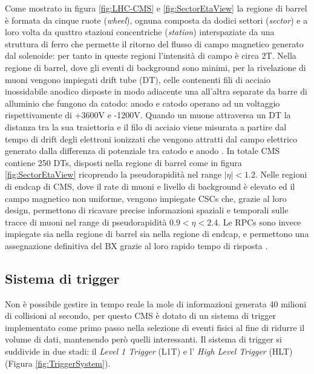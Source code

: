 Come mostrato in figura \ref{fig:LHC-CMS} e \ref{fig:SectorEtaView} la regione di barrel è formata da cinque ruote (\textit{wheel}), ognuna composta da dodici settori (\textit{sector}) e a loro volta da quattro stazioni concentriche (\textit{station}) interspaziate da una struttura di ferro che permette il ritorno del flusso di campo magnetico generato dal solenoide: per tanto in queste regioni l'intensità di campo è circa 2T. Nella regione di barrel, dove gli eventi di background sono minimi, per la rivelazione di muoni vengono impiegati drift tube (DT), celle contenenti fili di acciaio inossidabile anodico disposte in modo adiacente una all'altra separate da barre di alluminio che fungono da catodo: anodo e catodo operano ad un voltaggio rispettivamente di +3600V e -1200V. Quando un muone attraversa un DT la distanza tra la sua traiettoria e il filo di acciaio viene misurata a partire dal tempo di drift degli elettroni ionizzati che vengono attratti dal campo elettrico generato dalla differenza di potenziale tra catodo e anodo \cite{MasterThesisNicLai}. \newline
In totale CMS contiene 250 DTs, disposti nella regione di barrel come in figura \ref{fig:SectorEtaView} ricoprendo la pseudorapidità nel range $|\eta| < 1.2$. \newline
Nelle regioni di endcap di CMS, dove il rate di muoni e livello di background è elevato ed il campo magnetico non uniforme, vengono impiegate CSCs che, grazie al loro design, permettono di ricavare precise informazioni spaziali e temporali sulle tracce di muoni nel range di pseudorapidità $0.9 < \eta < 2.4$. Le RPCs sono invece impiegate sia nella regione di barrel sia nella regione di endcap, e permettono una assegnazione definitiva del BX grazie al loro rapido tempo di risposta \cite{MasterThesisNicLai, cms2008cms}.


\subsection{Sistema di trigger}
\label{sec:SistemaDiTrigger}

Non è possibile gestire in tempo reale la mole di informazioni generata 40 milioni di collisioni al secondo, per questo CMS è dotato di un sistema di trigger implementato come primo passo nella selezione di eventi fisici al fine di ridurre il volume di dati, mantenendo però quelli interessanti. Il sistema di trigger si suddivide in due stadi: il \textit{Level 1 Trigger} (L1T) e l' \textit{High Level Trigger} (HLT) (Figura \ref{fig:TriggerSystem}). 

